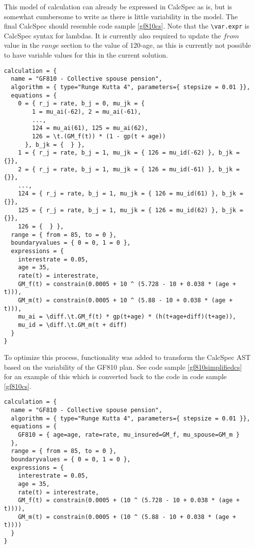 This model of calculation can already be expressed in CalcSpec as is, but is somewhat cumbersome to write as there is little variability in the model.
The final CalcSpec should resemble code sample \ref{gf810cs}.
Note that the \lstinline$\var.expr$ is CalcSpec syntax for lambdas. 
It is currently also required to update the $from$ value in the $range$ section to the value of 120-age, as this is currently not possible to have variable values for this in the current solution.
\begin{lstlisting}[language=calcspec, caption=GF810 full CalcSpec, label=gf810cs]
calculation = {
  name = "GF810 - Collective spouse pension", 
  algorithm = { type="Runge Kutta 4", parameters={ stepsize = 0.01 }}, 
  equations = { 
    0 = { r_j = rate, b_j = 0, mu_jk = { 
        1 = mu_ai(-62), 2 = mu_ai(-61),
        ...,
        124 = mu_ai(61), 125 = mu_ai(62), 
        126 = \t.(GM_f(t)) * (1 - gp(t + age))
      }, b_jk = {  } }, 
    1 = { r_j = rate, b_j = 1, mu_jk = { 126 = mu_id(-62) }, b_jk = {}}, 
    2 = { r_j = rate, b_j = 1, mu_jk = { 126 = mu_id(-61) }, b_jk = {}}, 
    ...,
    124 = { r_j = rate, b_j = 1, mu_jk = { 126 = mu_id(61) }, b_jk = {}}, 
    125 = { r_j = rate, b_j = 1, mu_jk = { 126 = mu_id(62) }, b_jk = {}}, 
    126 = {  } }, 
  range = { from = 85, to = 0 }, 
  boundaryvalues = { 0 = 0, 1 = 0 }, 
  expressions = { 
    interestrate = 0.05, 
    age = 35, 
    rate(t) = interestrate, 
    GM_f(t) = constrain(0.0005 + 10 ^ (5.728 - 10 + 0.038 * (age + t))), 
    GM_m(t) = constrain(0.0005 + 10 ^ (5.88 - 10 + 0.038 * (age + t))), 
    mu_ai = \diff.\t.GM_f(t) * gp(t+age) * (h(t+age+diff)(t+age)), 
    mu_id = \diff.\t.GM_m(t + diff) 
  }
}
\end{lstlisting}

To optimize this process, functionality was added to transform the CalcSpec AST based on the variability of the GF810 plan.
See code sample \ref{gf810simplifiedcs} for an example of this which is converted back to the code in code sample \ref{gf810cs}.
\clearpage
\begin{lstlisting}[language=calcspec, caption=GF810 simplified CalcSpec, label=gf810simplifiedcs]
calculation = { 
  name = "GF810 - Collective spouse pension", 
  algorithm = { type="Runge Kutta 4", parameters={ stepsize = 0.01 }}, 
  equations = { 
    GF810 = { age=age, rate=rate, mu_insured=GM_f, mu_spouse=GM_m }
  }, 
  range = { from = 85, to = 0 }, 
  boundaryvalues = { 0 = 0, 1 = 0 }, 
  expressions = { 
    interestrate = 0.05,
    age = 35,
    rate(t) = interestrate,
    GM_f(t) = constrain(0.0005 + (10 ^ (5.728 - 10 + 0.038 * (age + t)))),
    GM_m(t) = constrain(0.0005 + (10 ^ (5.88 - 10 + 0.038 * (age + t))))
  }
}
\end{lstlisting}

